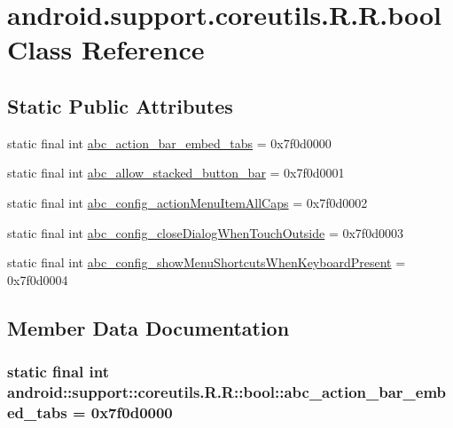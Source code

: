 \hypertarget{classandroid_1_1support_1_1coreutils_1_1_r_1_1bool}{
\section{android.support.coreutils.R.R.bool Class Reference}
\label{classandroid_1_1support_1_1coreutils_1_1_r_1_1bool}
}
\subsection*{Static Public Attributes}
\begin{CompactItemize}
\item 
static final int \hyperlink{classandroid_1_1support_1_1coreutils_1_1_r_1_1bool_f31d4bd682147c15d2f64955d0e5d288}{abc\_\-action\_\-bar\_\-embed\_\-tabs} = 0x7f0d0000
\item 
static final int \hyperlink{classandroid_1_1support_1_1coreutils_1_1_r_1_1bool_3bc2e895507660481f30cc62e8ca2113}{abc\_\-allow\_\-stacked\_\-button\_\-bar} = 0x7f0d0001
\item 
static final int \hyperlink{classandroid_1_1support_1_1coreutils_1_1_r_1_1bool_254e83dcbef9417f7a6461f1da19b1bb}{abc\_\-config\_\-actionMenuItemAllCaps} = 0x7f0d0002
\item 
static final int \hyperlink{classandroid_1_1support_1_1coreutils_1_1_r_1_1bool_b23de836e4c52e485b1445b7758bb04b}{abc\_\-config\_\-closeDialogWhenTouchOutside} = 0x7f0d0003
\item 
static final int \hyperlink{classandroid_1_1support_1_1coreutils_1_1_r_1_1bool_42f2debbdb4d4bf6ee61d0cd8c963a99}{abc\_\-config\_\-showMenuShortcutsWhenKeyboardPresent} = 0x7f0d0004
\end{CompactItemize}


\subsection{Member Data Documentation}
\hypertarget{classandroid_1_1support_1_1coreutils_1_1_r_1_1bool_f31d4bd682147c15d2f64955d0e5d288}{
\subsubsection[{abc\_\-action\_\-bar\_\-embed\_\-tabs}]{\setlength{\rightskip}{0pt plus 5cm}static final int android::support::coreutils.R.R::bool::abc\_\-action\_\-bar\_\-embed\_\-tabs = 0x7f0d0000}}
\label{classandroid_1_1support_1_1coreutils_1_1_r_1_1bool_f31d4bd682147c15d2f64955d0e5d288}


